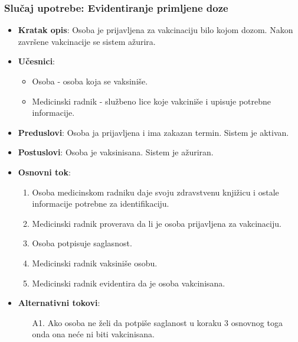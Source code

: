 \documentclass[titlepage]{article}
\begin{document}
\subsubsection{Slučaj upotrebe: Evidentiranje primljene doze}
\begin{itemize}
	\item \textbf{Kratak opis}: Osoba je prijavljena za vakcinaciju bilo kojom dozom. Nakon završene vakcinacije se sistem ažurira.
	\item \textbf{Učesnici}:
	\begin{itemize}
		\item Osoba - osoba koja se vaksiniše.
		\item Medicinski radnik - službeno lice koje vakciniše i upisuje potrebne informacije.
	\end{itemize}
	\item \textbf{Preduslovi}: Osoba ja prijavljena i ima zakazan termin. Sistem je aktivan.
	\item \textbf{Postuslovi}: Osoba je vaksinisana. Sistem je ažuriran.
	\item \textbf{Osnovni tok}:
	\begin{enumerate}
		\item Osoba medicinskom radniku daje svoju zdravstvenu knjižicu i ostale informacije potrebne za identifikaciju.
		\item Medicinski radnik proverava da li je osoba prijavljena za vakcinaciju.
		\item Osoba potpisuje saglasnost.
		\item Medicinski radnik vaksiniše osobu.
		\item Medicinski radnik evidentira da je osoba vakcinisana.
	\end{enumerate}
	\item \textbf{Alternativni tokovi}:
	\begin{enumerate}
		\item[A1.] Ako osoba ne želi da potpiše saglanost u koraku 3 osnovnog toga onda ona neće ni biti vakcinisana. 
	\end{enumerate}
\end{itemize}
\end{document}
